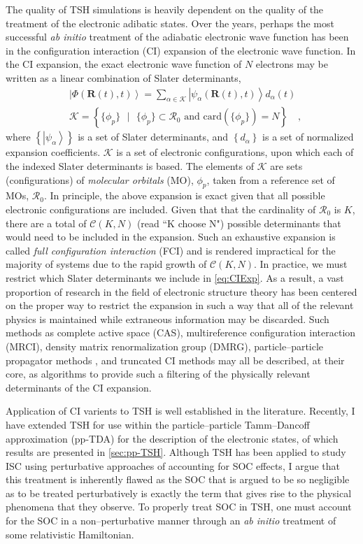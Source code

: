 \documentclass[12pt]{article}
\newcommand{\ket}[1]{\left\vert #1 \right\rangle}         %
\newcommand*\suchthat[0]{\text{ }\vert\text{ }}
\newcommand*\vc[1]{\boldsymbol{#1}}
\begin{document}
The quality of TSH simulations is heavily dependent on the quality of the
treatment of the electronic adibatic states.  Over the years, perhaps the most
successful \emph{ab initio} treatment of the adiabatic electronic wave function
has been in the configuration interaction (CI) expansion of the electronic wave
function. In the CI expansion, the exact electronic wave function of $N$
electrons may be written as a linear combination of Slater determinants,
\begin{align}
&\ket{\Phi (\vc{R}(t),t)} = \sum_{\alpha \in \mathcal{K}}  
  \ket{\psi_\alpha (\vc{R}(t),t)} d_\alpha(t)
\label{eq:CIExp} \\
& \mathcal{K} = \left\lbrace \{ \phi_p \} \suchthat \{ \phi_p \} \subset
\mathcal{R}_0 \text{ and } \mathrm{card}(\{ \phi_p \}) = N \right\rbrace
\quad ,
\end{align}
where $\left\lbrace\ket{\psi_\alpha}\right\rbrace$ is a set of Slater
determinants, and $\left\lbrace d_\alpha \right\rbrace$ is a set of normalized
expansion coefficients. $\mathcal{K}$ is a set of electronic configurations,
upon which each of the indexed Slater determinants is based. The elements of
$\mathcal{K}$ are sets (configurations) of \emph{molecular orbitals} (MO),
$\phi_p$, taken from a reference set of MOs, $\mathcal{R}_0$.  In principle, the
above expansion is exact given that all possible electronic configurations are
included.  Given that that the cardinality of $\mathcal{R}_0$ is $K$, there are
a total of $\mathcal{C}(K,N)$ (read ``K choose N") possible determinants that
would need to be included in the expansion. Such an exhaustive expansion is
called \emph{full configuration interaction} (FCI) and is rendered impractical
for the majority of systems due to the rapid growth of $\mathcal{C}(K,N)$.
In practice, we  must restrict which Slater determinants we include in
\cref{eq:CIExp}. As a result, a vast proportion of research in the field of
electronic structure theory has been centered on the proper way to restrict the
expansion in such a way that all of the relevant physics is maintained while
extraneous information may be discarded. Such methods as complete active space
(CAS), multireference configuration interaction (MRCI), density matrix
renormalization group (DMRG), particle--particle propagator methods , and
truncated CI methods may all be described, at their core, as algorithms to
provide such a filtering of the physically relevant determinants of the CI
expansion. 

Application of CI varients to TSH is well established in the literature.
Recently, I have extended TSH for use within the particle--particle
Tamm--Dancoff approximation (pp-TDA) for the description of the electronic
states\cite{DBWY16_Submitted1}, of which results are presented in
\cref{sec:pp-TSH}. Although TSH has been applied to study ISC using perturbative
approaches of accounting for SOC effects, I argue that this treatment is
inherently flawed as the SOC that is argued to be so negligible as to be treated
perturbatively is exactly the term that gives rise to the physical phenomena
that they observe. To properly treat SOC in TSH, one must account for the SOC in
a non--perturbative manner through an \emph{ab initio} treatment of some
relativistic Hamiltonian.
\end{document}
